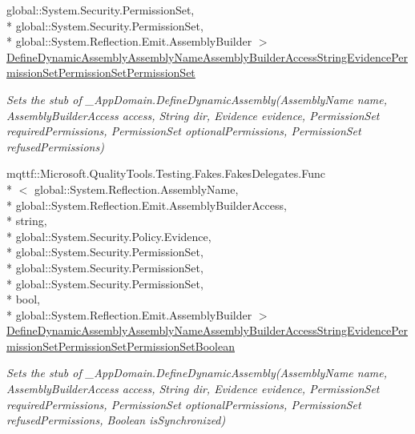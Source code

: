 \begin{DoxyCompactItemize}
global\-::\-System.\-Security.\-Permission\-Set, \\*
global\-::\-System.\-Security.\-Permission\-Set, \\*
global\-::\-System.\-Reflection.\-Emit.\-Assembly\-Builder $>$ \hyperlink{class_system_1_1_fakes_1_1_stub___app_domain_a97b51300c8e6d34c623de11d99c62404}{Define\-Dynamic\-Assembly\-Assembly\-Name\-Assembly\-Builder\-Access\-String\-Evidence\-Permission\-Set\-Permission\-Set\-Permission\-Set}
\begin{DoxyCompactList}\small\item\em Sets the stub of \-\_\-\-App\-Domain.\-Define\-Dynamic\-Assembly(\-Assembly\-Name name, Assembly\-Builder\-Access access, String dir, Evidence evidence, Permission\-Set required\-Permissions, Permission\-Set optional\-Permissions, Permission\-Set refused\-Permissions)\end{DoxyCompactList}\item 
mqttf\-::\-Microsoft.\-Quality\-Tools.\-Testing.\-Fakes.\-Fakes\-Delegates.\-Func\\*
$<$ global\-::\-System.\-Reflection.\-Assembly\-Name, \\*
global\-::\-System.\-Reflection.\-Emit.\-Assembly\-Builder\-Access, \\*
string, \\*
global\-::\-System.\-Security.\-Policy.\-Evidence, \\*
global\-::\-System.\-Security.\-Permission\-Set, \\*
global\-::\-System.\-Security.\-Permission\-Set, \\*
global\-::\-System.\-Security.\-Permission\-Set, \\*
bool, \\*
global\-::\-System.\-Reflection.\-Emit.\-Assembly\-Builder $>$ \hyperlink{class_system_1_1_fakes_1_1_stub___app_domain_a617e2ad26aa95aea63264f20e3f4c41e}{Define\-Dynamic\-Assembly\-Assembly\-Name\-Assembly\-Builder\-Access\-String\-Evidence\-Permission\-Set\-Permission\-Set\-Permission\-Set\-Boolean}
\begin{DoxyCompactList}\small\item\em Sets the stub of \-\_\-\-App\-Domain.\-Define\-Dynamic\-Assembly(\-Assembly\-Name name, Assembly\-Builder\-Access access, String dir, Evidence evidence, Permission\-Set required\-Permissions, Permission\-Set optional\-Permissions, Permission\-Set refused\-Permissions, Boolean is\-Synchronized)\end{DoxyCompactList}\item 

\end{DoxyCompactItemize}
